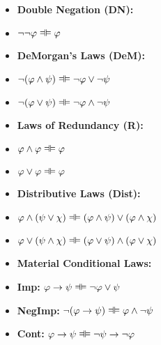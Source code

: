 \begin{multicols}{2}

\begin{itemize}
\item[] \textbf{Double Negation (DN):}
\item[]$\enot\enot \meta{\varphi} \lequiv \meta{\varphi}$


\item[] \textbf{DeMorgan's Laws (DeM):}

\item[] $\enot(\meta{\varphi} \eand  \meta{\psi}) \lequiv \enot \meta{\varphi} \eor \enot \meta{\psi}$
\item[] $\enot(\meta{\varphi} \eor \meta{\psi}) \lequiv \enot \meta{\varphi} \eand  \enot \meta{\psi}$


\item[]  \textbf{Laws of Redundancy (R):}

\item[] $\meta{\varphi} \eand  \meta{\varphi} \lequiv \meta{\varphi}$
\item[] $\meta{\varphi} \eor \meta{\varphi} \lequiv \meta{\varphi}$


\end{itemize}

\columnbreak

\begin{itemize}
\item[] \textbf{Distributive Laws (Dist):}
\item[] $\meta{\varphi} \eand  (\meta{\psi} \eor \meta{\chi}) \lequiv (\meta{\varphi} \eand  \meta{\psi}) \eor (\meta{\varphi} \eand  \meta{\chi})$
\item[] $\meta{\varphi} \eor (\meta{\psi} \eand  \meta{\chi}) \lequiv (\meta{\varphi} \eor \meta{\psi}) \eand  (\meta{\varphi} \eor \meta{\chi})$

\item[]  \textbf{Material Conditional Laws:}

\item[] \textbf{Imp:} $\meta{\varphi} \eif \meta{\psi} \lequiv \enot \meta{\varphi} \eor \meta{\psi}$
\item[] \textbf{NegImp:} $\enot(\meta{\varphi} \eif \meta{\psi}) \lequiv \meta{\varphi} \eand  \enot \meta{\psi}$
\item[] \textbf{Cont:} $\meta{\varphi} \eif \meta{\psi} \lequiv \enot \meta{\psi} \eif \enot \meta{\varphi}$

\end{itemize}


\end{multicols}

